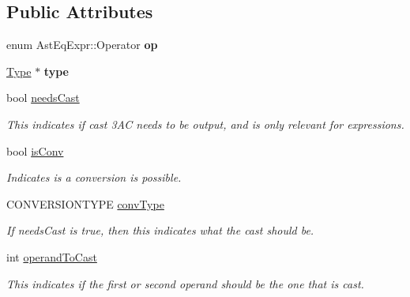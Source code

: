 \subsection*{Public Attributes}
\begin{DoxyCompactItemize}
\item 
\hypertarget{classAstEqExpr_ad076bd5372d6dd95b43440080b782a7a}{enum Ast\-Eq\-Expr\-::\-Operator {\bfseries op}}\label{classAstEqExpr_ad076bd5372d6dd95b43440080b782a7a}

\item 
\hypertarget{classAstEqExpr_a3f6db3c55a6d3680bedd549de72efaf2}{\hyperlink{classType}{Type} $\ast$ {\bfseries type}}\label{classAstEqExpr_a3f6db3c55a6d3680bedd549de72efaf2}

\item 
\hypertarget{classAST_aaf215802de409f8096c063d01ffa6783}{bool \hyperlink{classAST_aaf215802de409f8096c063d01ffa6783}{needs\-Cast}}\label{classAST_aaf215802de409f8096c063d01ffa6783}

\begin{DoxyCompactList}\small\item\em This indicates if cast 3\-A\-C needs to be output, and is only relevant for expressions. \end{DoxyCompactList}\item 
\hypertarget{classAST_afa9e77ef650ec6664458fa6cb55be985}{bool \hyperlink{classAST_afa9e77ef650ec6664458fa6cb55be985}{is\-Conv}}\label{classAST_afa9e77ef650ec6664458fa6cb55be985}

\begin{DoxyCompactList}\small\item\em Indicates is a conversion is possible. \end{DoxyCompactList}\item 
\hypertarget{classAST_a61ef3317e023d45237e06615b387cd6b}{C\-O\-N\-V\-E\-R\-S\-I\-O\-N\-T\-Y\-P\-E \hyperlink{classAST_a61ef3317e023d45237e06615b387cd6b}{conv\-Type}}\label{classAST_a61ef3317e023d45237e06615b387cd6b}

\begin{DoxyCompactList}\small\item\em If needs\-Cast is true, then this indicates what the cast should be. \end{DoxyCompactList}\item 
\hypertarget{classAST_aea9b07b39d24183f38c0029cec0a878e}{int \hyperlink{classAST_aea9b07b39d24183f38c0029cec0a878e}{operand\-To\-Cast}}\label{classAST_aea9b07b39d24183f38c0029cec0a878e}

\begin{DoxyCompactList}\small\item\em This indicates if the first or second operand should be the one that is cast. \end{DoxyCompactList}\end{DoxyCompactItemize}
